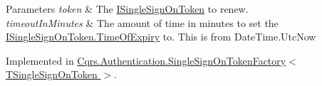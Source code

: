\begin{DoxyParams}{Parameters}
{\em token} & The \hyperlink{interfaceCqrs_1_1Authentication_1_1ISingleSignOnToken}{I\+Single\+Sign\+On\+Token} to renew.\\
\hline
{\em timeout\+In\+Minutes} & The amount of time in minutes to set the \hyperlink{interfaceCqrs_1_1Authentication_1_1ISingleSignOnToken_a50af484569cc78f88acb01f1938a7cd8_a50af484569cc78f88acb01f1938a7cd8}{I\+Single\+Sign\+On\+Token.\+Time\+Of\+Expiry} to. This is from Date\+Time.\+Utc\+Now\\
\hline
\end{DoxyParams}


Implemented in \hyperlink{classCqrs_1_1Authentication_1_1SingleSignOnTokenFactory_a699ceac65874b8319d2e26fa88f554be_a699ceac65874b8319d2e26fa88f554be}{Cqrs.\+Authentication.\+Single\+Sign\+On\+Token\+Factory$<$ T\+Single\+Sign\+On\+Token $>$}.

